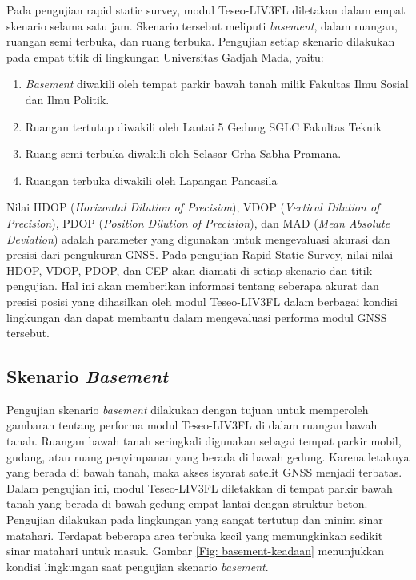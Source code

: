 Pada pengujian rapid static survey, modul Teseo-LIV3FL diletakan dalam empat skenario selama satu jam. Skenario tersebut meliputi \textit{basement}, dalam ruangan, ruangan semi terbuka, dan ruang terbuka. Pengujian setiap skenario dilakukan pada empat titik di lingkungan Universitas Gadjah Mada, yaitu:

\begin{enumerate}
	\item \textit{Basement} diwakili oleh tempat parkir bawah tanah milik Fakultas Ilmu Sosial dan Ilmu Politik.
	\item Ruangan tertutup diwakili oleh Lantai 5 Gedung SGLC Fakultas Teknik
	\item Ruang semi terbuka diwakili oleh Selasar Grha Sabha Pramana.
	\item Ruangan terbuka diwakili oleh Lapangan Pancasila
\end{enumerate}

Nilai HDOP (\textit{Horizontal Dilution of Precision}), VDOP (\textit{Vertical Dilution of Precision}), PDOP (\textit{Position Dilution of Precision}), dan MAD (\textit{Mean Absolute Deviation}) adalah parameter yang digunakan untuk mengevaluasi akurasi dan presisi dari pengukuran GNSS. Pada pengujian Rapid Static Survey, nilai-nilai HDOP, VDOP, PDOP, dan CEP akan diamati di setiap skenario dan titik pengujian. Hal ini akan memberikan informasi tentang seberapa akurat dan presisi posisi yang dihasilkan oleh modul Teseo-LIV3FL dalam berbagai kondisi lingkungan dan dapat membantu dalam mengevaluasi performa modul GNSS tersebut.

\subsection{Skenario \textit{Basement}}
Pengujian skenario \textit{basement} dilakukan dengan tujuan untuk memperoleh gambaran tentang performa modul Teseo-LIV3FL di dalam ruangan bawah tanah. Ruangan bawah tanah seringkali digunakan sebagai tempat parkir mobil, gudang, atau ruang penyimpanan yang berada di bawah gedung. Karena letaknya yang berada di bawah tanah, maka akses isyarat satelit GNSS menjadi terbatas. Dalam pengujian ini, modul Teseo-LIV3FL diletakkan di tempat parkir bawah tanah yang berada di bawah gedung empat lantai dengan struktur beton. Pengujian dilakukan pada lingkungan yang sangat tertutup dan minim sinar matahari. Terdapat beberapa area terbuka kecil yang memungkinkan sedikit sinar matahari untuk masuk. Gambar \ref{Fig: basement-keadaan} menunjukkan kondisi lingkungan saat pengujian skenario \textit{basement}.

